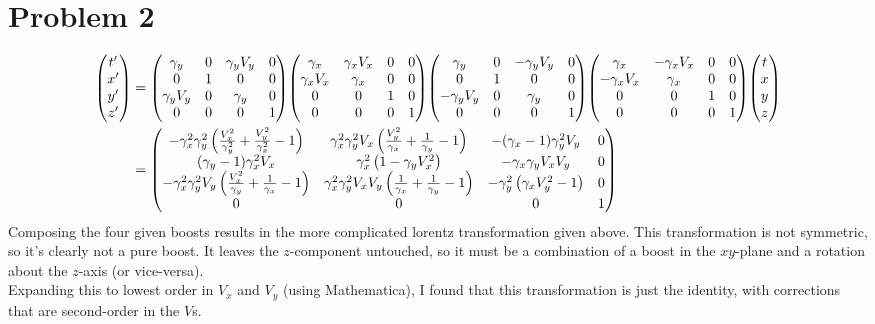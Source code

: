 \documentclass[12pt]{article}
\begin{document}
\section*{Problem 2}
\begin{align*}
    \mqty(t' \\ x' \\ y' \\ z') &= 
        \mqty(
            \gamma_y & 0 & \gamma_y V_y & 0 \\
            0 & 1 & 0 & 0 \\
            \gamma_y V_y & 0 & \gamma_y & 0 \\
            0 & 0 & 0 & 1
        )
        \mqty(
            \gamma_x & \gamma_x V_x & 0 & 0 \\
            \gamma_x V_x & \gamma_x & 0 & 0 \\
            0 & 0 & 1 & 0 \\
            0 & 0 & 0 & 1
        )
        \mqty(
            \gamma_y & 0 & -\gamma_y V_y & 0 \\
            0 & 1 & 0 & 0 \\
            -\gamma_y V_y & 0 & \gamma_y & 0 \\
            0 & 0 & 0 & 1
        )
        \mqty(
            \gamma_x & -\gamma_x V_x & 0 & 0 \\
            -\gamma_x V_x & \gamma_x & 0 & 0 \\
            0 & 0 & 1 & 0 \\
            0 & 0 & 0 & 1
        )
        \mqty(t \\ x \\ y \\ z) \\
    &= \mqty(
        -\gamma_x^2\gamma_y^2 \left(\frac{V_x^2}{\gamma_y^2} + \frac{V_y^2}{\gamma_x^2} - 1 \right) & \gamma_x^2\gamma_y^2V_x\left(\frac{V_y^2}{\gamma_x} + \frac{1}{\gamma_y} - 1\right) & -(\gamma_x - 1)\gamma_y^2V_y & 0 \\
        (\gamma_y - 1)\gamma_x^2V_x & \gamma_x^2\left(1 - \gamma_yV_x^2\right) & -\gamma_x\gamma_yV_xV_y & 0 \\
        -\gamma_x^2\gamma_y^2V_y\left(\frac{V_x^2}{\gamma_y} + \frac{1}{\gamma_x} - 1\right) & \gamma_x^2\gamma_y^2V_xV_y\left(\frac{1}{\gamma_x} + \frac{1}{\gamma_y} - 1\right) & -\gamma_y^2\left(\gamma_xV_y^2 - 1\right) & 0 \\
        0 & 0 & 0 & 1
        )
\end{align*}
Composing the four given boosts results in the more complicated lorentz transformation given above. This transformation is not symmetric, so it's clearly not a pure boost. It leaves the $z$-component untouched, so it must be a combination of a boost in the $xy$-plane and a rotation about the $z$-axis (or vice-versa). \\
Expanding this to lowest order in $V_x$ and $V_y$ (using Mathematica), I found that this transformation is just the identity, with corrections that are second-order in the $V$s.
\end{document}
